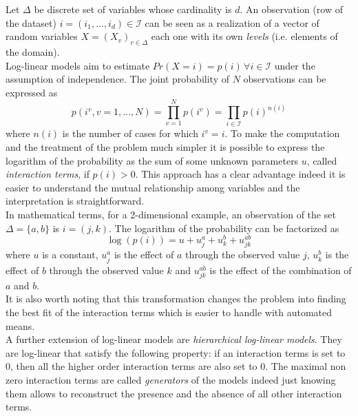 \documentclass{article}
\begin{document}
Let $\Delta$ be discrete set of variables whose cardinality is $d$. An observation (row of the dataset) $i = (i_1,...,i_d) \in \mathcal{I}$ can be seen as a realization of a vector of random variables $X = (X_v)_{v \in \Delta}$ each one with its own \textit{levels} (i.e. elements of the domain).\\
Log-linear models aim to estimate $Pr(X=i) = p(i) \, \forall i \in \mathcal{I}$ under the assumption of independence. The joint probability of $N$ observations can be expressed as
\begin{equation}
p(i^v,v =1,...,N) = \prod\limits_{v=1}^{N}p(i^v) =  \prod\limits_{i \in \mathcal{I}}p(i)^{n(i)}
\end{equation}
where $n(i)$ is the number of cases for which $i^v = i$.
To make the computation and the treatment of the problem much simpler it is possible to express the logarithm of the probability as the sum of some unknown parameters $u$, called \textit{interaction terms}, if $p(i) > 0$. This approach has a clear advantage indeed it is easier to understand the mutual relationship among variables and the interpretation is straightforward. \\
In mathematical terms, for a 2-dimensional example, an observation of the set $\Delta = \{a,b\}$ is $i = (j,k)$. The logarithm of the probability can be factorized as
\begin{equation}
   \log(p(i)) = u + u^a_j  + u^b_k + u^{ab}_{jk} 
\end{equation}
where $u$ is a constant, $ u^a_j$ is the effect of $a$ through the observed value $j$,  $ u^b_k$ is the effect of $b$ through the observed value $k$ and  $u^{ab}_{jk}$ is the effect of the combination of $a$ and $b$. \\
It is also worth noting that this transformation changes the problem into finding the best fit of the interaction terms which is easier to handle with automated means.\\
A further extension of log-linear models are \textit{hierarchical log-linear models}. They are log-linear that satisfy the following property: if an interaction terms is set to 0, then all the higher order interaction terms are also set to 0. The maximal non zero interaction terms are called \textit{generators} of the models indeed just knowing them allows to reconstruct the presence and the absence of all other interaction terms. \\
\end{document}
